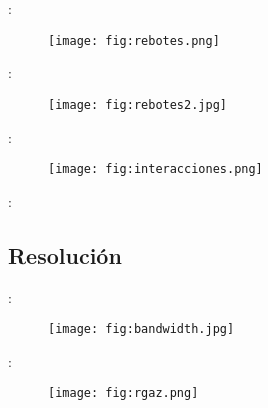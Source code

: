 \begin{frame}{\secname : \subsecname}
    \begin{figure}
      \centering
      \texttt{[image: fig:rebotes.png]}
      \caption{}
      \label{}
    \end{figure}
\end{frame}

\begin{frame}{\secname : \subsecname}
    \begin{figure}
      \centering
      \texttt{[image: fig:rebotes2.jpg]}
      \caption{}
      \label{}
    \end{figure}
\end{frame}

\begin{frame}{\secname : \subsecname}
    \begin{figure}
      \centering
      \texttt{[image: fig:interacciones.png]}
      \caption{}
      \label{}
    \end{figure}
\end{frame}

\begin{frame}{\secname : \subsecname}
    \begin{figure}
    \centering
    \hspace{1cm}
    \hspace{1cm}
    \end{figure}
\end{frame}

\subsection{Resolución}
\begin{frame}{\secname : \subsecname}
    \begin{figure}
      \centering
      \texttt{[image: fig:bandwidth.jpg]}
      \caption{}
      \label{}
    \end{figure}
\end{frame}


\begin{frame}{\secname : \subsecname}
    \begin{figure}
      \centering
      \texttt{[image: fig:rgaz.png]}
      \caption{}
      \label{}
    \end{figure}
\end{frame}

